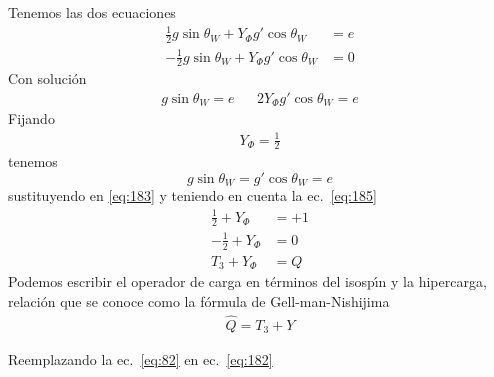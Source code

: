 Tenemos las dos ecuaciones
\begin{align}
  \label{eq:183}
  \tfrac{1}{2}g\sin\theta_W+Y_\Phi g'\cos\theta_W&=e\nonumber\\
 -\tfrac{1}{2}g\sin\theta_W+Y_\Phi g'\cos\theta_W&=0
\end{align}
Con soluci\'on
\begin{align}
g\sin\theta_W=e &&2Y_\Phi g'\cos\theta_W=e
\end{align}
Fijando
\begin{align}
  Y_\Phi=\frac{1}{2}
\end{align}
tenemos
\begin{equation}
  \label{eq:82}
  g\sin\theta_W=g'\cos\theta_W=e
\end{equation}
sustituyendo en \eqref{eq:183} y teniendo en cuenta la ec.~\eqref{eq:185}
\begin{align}
  \frac{1}{2}+Y_\Phi&=+1\nonumber\\
  -\frac{1}{2}+Y_\Phi&=0\nonumber\\
  T_3+Y_\Phi&=Q
\end{align}
Podemos escribir el operador de carga en t\'erminos del isosp\'\i n y la hipercarga, relaci\'on que se conoce como la f\'ormula de Gell-man-Nishijima
\begin{align}
  \label{eq:184}
  \hat Q=T_3+Y
\end{align}

Reemplazando la ec.~\eqref{eq:82} en ec.~\eqref{eq:182}

